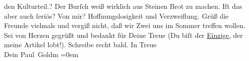 \begin{ledgroupsized}[t]{13cm}
{{{                  den Kulturteil.}}}\label{K_L02613-1h}? Der Burſch weiß wirklich aus Steinen Brot zu machen. Iſt das aber auch
               ſeriös?\pend
           \pstart
           Von mir? Hoffnungslosigkeit und Verzweiflung.\pend
           \pstart
           Grüß die Freunde vielmals und vergiß nicht, daß wir Zwei uns im Sommer treffen
               wollen. Sei von Herzen gegrüßt und bedankt für Deine Treue (Du biſt der \uline{Einzige}, der meine Artikel lobt!). Schreibe recht
               bald.\pend
           \pstart
           In Treue {\\[\baselineskip]}Dein \spacefill\mbox{Paul Goldm}\pend
           \leftskip=0em{}          \endnumbering{}\end{ledgroupsized}\begin{anhang}\end{anhang}\newcommand{\dateiname}{L02613}\newcommand{\titel}{Paul Goldmann an Arthur Schnitzler, 21. 3. [1894]}\newcommand{\editorInnen}{Martin Anton Müller und Laura Untner}
            \footnotesize
\begin{ledgroupsized}[t]{11.5cm}
\end{ledgroupsized}
         
      